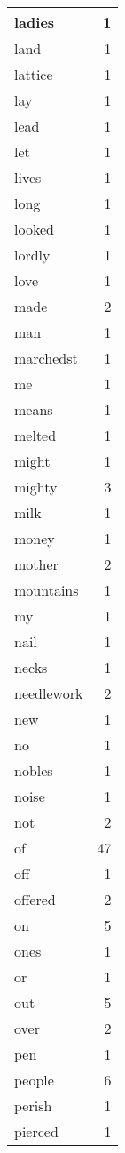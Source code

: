 \begin{center}
\begin{longtable}{l|r}
ladies & 1\\ \hline 
land & 1\\ \hline 
lattice & 1\\ \hline 
lay & 1\\ \hline 
lead & 1\\ \hline 
let & 1\\ \hline 
lives & 1\\ \hline 
long & 1\\ \hline 
looked & 1\\ \hline 
lordly & 1\\ \hline 
love & 1\\ \hline 
made & 2\\ \hline 
man & 1\\ \hline 
marchedst & 1\\ \hline 
me & 1\\ \hline 
means & 1\\ \hline 
melted & 1\\ \hline 
might & 1\\ \hline 
mighty & 3\\ \hline 
milk & 1\\ \hline 
money & 1\\ \hline 
mother & 2\\ \hline 
mountains & 1\\ \hline 
my & 1\\ \hline 
nail & 1\\ \hline 
necks & 1\\ \hline 
needlework & 2\\ \hline 
new & 1\\ \hline 
no & 1\\ \hline 
nobles & 1\\ \hline 
noise & 1\\ \hline 
not & 2\\ \hline 
of & 47\\ \hline 
off & 1\\ \hline 
offered & 2\\ \hline 
on & 5\\ \hline 
ones & 1\\ \hline 
or & 1\\ \hline 
out & 5\\ \hline 
over & 2\\ \hline 
pen & 1\\ \hline 
people & 6\\ \hline 
perish & 1\\ \hline 
pierced & 1\\ \hline 

\end{longtable}
\end{center}
